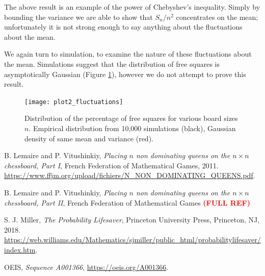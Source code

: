 \documentclass[12pt,reqno]{amsart}
\newcommand{\bburl}[1]{\textcolor{blue}{\url{#1}}}
\numberwithin{equation}{section}
\theoremstyle{plain}
\newcommand{\fix}[1]{\textcolor{red}{\textbf{\large (#1)\normalsize}}}
\begin{document}
The above result is an example of the power of Chebyshev's inequality. Simply by bounding the variance we are able to show that $S_n/n^2$ concentrates on the mean; unfortunately it is not strong enough to say anything about the fluctuations about the mean.

We again turn to simulation, to examine the nature of these fluctuations about the mean.  Simulations suggest that the distribution of free squares is asymptotically Gaussian (Figure \ref{fig:fluctuations}), however we do not attempt to prove this result.

\begin{figure}[h]
\centering
\texttt{[image: plot2\_fluctuations]}
\caption{Distribution of the percentage of free squares for various board sizes $n$.  Empirical distribution from 10,000 simulations (black), Gaussian density of same mean and variance (red).}
\label{fig:fluctuations}
\end{figure}


\begin{thebibliography}{99999} %

B. Lemaire and P. Vitushinkiy, \emph{Placing $n$ non dominating queens on the $n \times n$ chessboard, Part I}, French Federation of Mathematical Games, 2011. \bburl{https://www.ffjm.org/upload/fichiers/N_NON_DOMINATING_QUEENS.pdf}.

B. Lemaire and P. Vitushinkiy, \emph{Placing $n$ non dominating queens on the $n \times n$ chessboard, Part II}, French Federation of Mathematical Games \fix{FULL REF}

S. J. Miller, \emph{The Probability Lifesaver}, Princeton University Press, Princeton, NJ, 2018. \bburl{https://web.williams.edu/Mathematics/sjmiller/public_html/probabilitylifesaver/index.htm}.


OEIS, \emph{Sequence A001366},  \bburl{https://oeis.org/A001366}.

\end{thebibliography}


\ \\
\end{document}

